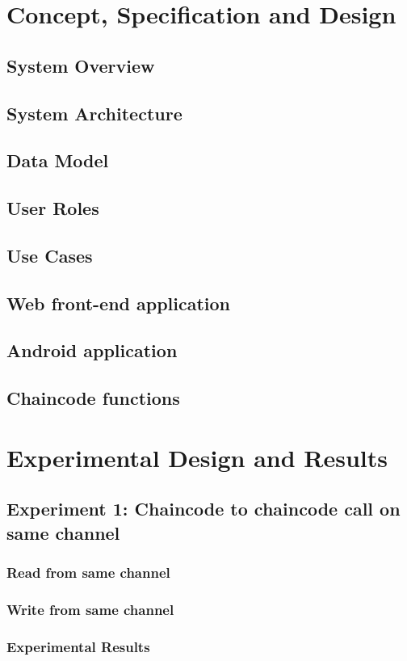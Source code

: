 \documentclass[
  a4paper,  %
  twoside,  %
  bibliography=totoc,
  headsepline,
  cleardoublepage=empty,
  parskip=half,
  draft=false
]{scrbook}
\begin{document}
\chapter{Concept, Specification and Design}
\label{chap:cs}
\section{System Overview}
\section{System Architecture}
\section{Data Model}
\section{User Roles}
\section{Use Cases}
\section{Web front-end application}
\section{Android application}
\section{Chaincode functions}


\chapter{Experimental Design and Results}
\label{chap:de}
\section{Experiment 1: Chaincode to chaincode call on same channel}
\subsection{Read from same channel}
\subsection{Write from same channel}
\subsection{Experimental Results}
\end{document}
